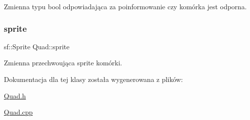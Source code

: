 Zmienna typu bool odpowiadająca za poinformowanie czy komórka jest odporna. \mbox{\label{class_quad_a83667bb824c1d6eca6c9c8b6e6d07d06}} 
\subsubsection{\texorpdfstring{sprite}{sprite}}
{\footnotesize\ttfamily sf\+::\+Sprite Quad\+::sprite\hspace{0.3cm}{\ttfamily [private]}}

Zmienna przechwoująca sprite komórki. 

Dokumentacja dla tej klasy została wygenerowana z plików\+:\begin{DoxyCompactItemize}
\item 
\mbox{\hyperlink{_quad_8h}{Quad.\+h}}\item 
\mbox{\hyperlink{_quad_8cpp}{Quad.\+cpp}}\end{DoxyCompactItemize}
